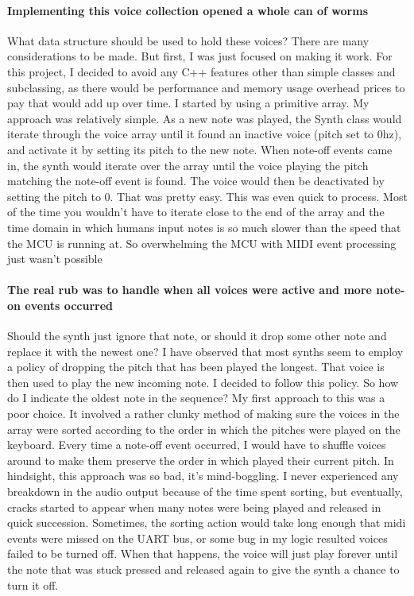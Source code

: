 \documentclass[acmlarge,screen]{acmart}
\begin{document}
	\paragraph{Implementing this voice collection opened a whole can of worms} What data structure should be used to hold these voices? There are many considerations to be made. But first, I was just focused on making it work. For this project, I decided to avoid any C++ features other than simple classes and subclassing, as there would be performance and memory usage overhead prices to pay that would add up over time. I started by using a primitive array. My approach was relatively simple. As a new note was played, the Synth class would iterate through the voice array until it found an inactive voice (pitch set to 0hz), and activate it by setting its pitch to the new note. When note-off events came in, the synth would iterate over the array until the voice playing the pitch matching the note-off event is found. The voice would then be deactivated by setting the pitch to 0. That was pretty easy. This was even quick to process. Most of the time you wouldn't have to iterate close to the end of the array and the time domain in which humans input notes is so much slower than the speed that the MCU is running at. So overwhelming the MCU with MIDI event processing just wasn't possible

	\paragraph{The real rub was to handle when all voices were active and more note-on events occurred} Should the synth just ignore that note, or should it drop some other note and replace it with the newest one? I have observed that most synths seem to employ a policy of dropping the pitch that has been played the longest. That voice is then used to play the new incoming note. I decided to follow this policy. So how do I indicate the oldest note in the sequence?  My first approach to this was a poor choice. It involved a rather clunky method of making sure the voices in the array were sorted according to the order in which the pitches were played on the keyboard. Every time a note-off event occurred, I would have to shuffle voices around to make them preserve the order in which played their current pitch. In hindsight, this approach was so bad, it's mind-boggling. I never experienced any breakdown in the audio output because of the time spent sorting, but eventually, cracks started to appear when many notes were being played and released in quick succession. Sometimes, the sorting action would take long enough that midi events were missed on the UART bus, or some bug in my logic resulted voices failed to be turned off. When that happens, the voice will just play forever until the note that was stuck pressed and released again to give the synth a chance to turn it off.
\end{document}
